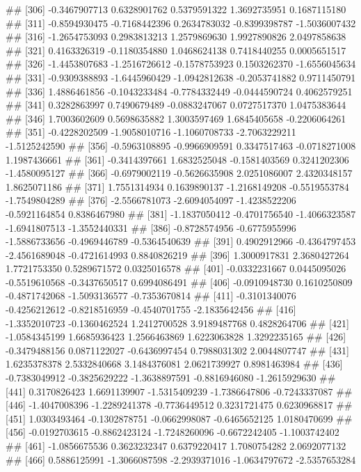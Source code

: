 \documentclass[
]{article}
\begin{document}
\begin{enumerate}[label=(\alph*)]
##  [306] -0.3467907713  0.6328901762  0.5379591322  1.3692735951  0.1687115180
##  [311] -0.8594930475 -0.7168442396  0.2634783032 -0.8399398787 -1.5036007432
##  [316] -1.2654753093  0.2983813213  1.2579869630  1.9927890826  2.0497858638
##  [321]  0.4163326319 -0.1180354880  1.0468624138  0.7418440255  0.0005651517
##  [326] -1.4453807683 -1.2516726612 -0.1578753923  0.1503262370 -1.6556045634
##  [331] -0.9309388893 -1.6445960429 -1.0942812638 -0.2053741882  0.9711450791
##  [336]  1.4886461856 -0.1043233484 -0.7784332449 -0.0444590724  0.4062579251
##  [341]  0.3282863997  0.7490679489 -0.0883247067  0.0727517370  1.0475383644
##  [346]  1.7003602609  0.5698635882  1.3003597469  1.6845405658 -0.2206064261
##  [351] -0.4228202509 -1.9058010716 -1.1060708733 -2.7063229211 -1.5125242590
##  [356] -0.5963108895 -0.9966909591  0.3347517463 -0.0718271008  1.1987436661
##  [361] -0.3414397661  1.6832525048 -0.1581403569  0.3241202306 -1.4580095127
##  [366] -0.6979002119 -0.5626635908  2.0251086007  2.4320348157  1.8625071186
##  [371]  1.7551314934  0.1639890137 -1.2168149208 -0.5519553784 -1.7549804289
##  [376] -2.5566781073 -2.6094054097 -1.4238522206 -0.5921164854  0.8386467980
##  [381] -1.1837050412 -0.4701756540 -1.4066323587 -1.6941807513 -1.3552440331
##  [386] -0.8728574956 -0.6775955996 -1.5886733656 -0.4969446789 -0.5364540639
##  [391]  0.4902912966 -0.4364797453 -2.4561689048 -0.4721614993  0.8840826219
##  [396]  1.3000917831  2.3680427264  1.7721753350  0.5289671572  0.0325016578
##  [401] -0.0332231667  0.0445095026 -0.5519610568 -0.3437650517  0.6994086491
##  [406] -0.0910948730  0.1610250809 -0.4871742068 -1.5093136577 -0.7353670814
##  [411] -0.3101340076 -0.4256212612 -0.8218516959 -0.4540701755 -2.1835642456
##  [416] -1.3352010723 -0.1360462524  1.2412700528  3.9189487768  0.4828264706
##  [421] -1.0584345199  1.6685936423  1.2566463869  1.6223063828  1.3292235165
##  [426] -0.3479488156  0.0871122027 -0.6436997454  0.7988031302  2.0044807747
##  [431]  1.6235378378  2.5332840668  3.1484376081  2.0621739927  0.8981463984
##  [436] -0.7383049912 -0.3825629222 -1.3638897591 -0.8816946080 -1.2615929630
##  [441]  0.3170826423  1.6691139907 -1.5315409239 -1.7386647806 -0.7243337087
##  [446] -1.4047008396 -1.2289241378 -0.7736449512  0.3231721475  0.6230968817
##  [451]  1.0303493464 -0.1302878751 -0.0662998087 -0.6465652125  1.0180470699
##  [456] -0.0192703615 -0.8862423124 -1.7248260096 -0.6672242405 -1.1003742402
##  [461] -1.0856675536  0.3623232347  0.6379220417  1.7080754282  2.0692077132
##  [466]  0.5886125991 -1.3066087598 -2.2939371016 -1.0634797672 -2.5357653284

\end{enumerate}
\end{document}
